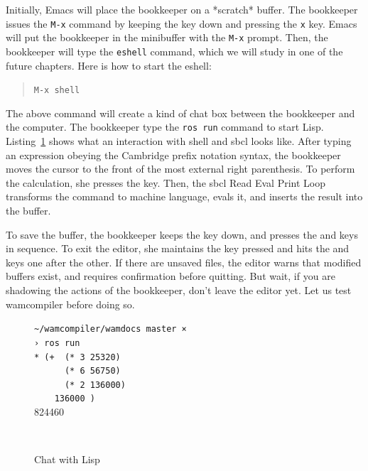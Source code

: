 \documentclass[a4paper,12pt]{book}
\newenvironment{fmpage}[1]
           {\begin{lrbox}{\fmbox}\begin{minipage}{#1}}
           {\end{minipage}\end{lrbox}\fbox{\usebox{\fmbox}}}
\begin{document}
Initially, Emacs will place the bookkeeper
on a *scratch* buffer. The bookkeeper issues
the \verb|M-x| command by keeping the 
key down and pressing the \verb|x| key.
Emacs will put the bookkeeper in the minibuffer
with the \verb|M-x| prompt. Then, the bookkeeper
will type the \verb|eshell| command, which we
will study in one of the future chapters.
Here is how to start the eshell:
\begin{quote}
\verb|M-x shell| 
\end{quote}
The above command will create a kind of chat
box between the bookkeeper and the computer.
The bookkeeper type the \verb|ros run| command
to start Lisp.  Listing~\ref{texan:photos} shows
what an interaction with shell and sbcl looks
like. After typing an expression obeying the
Cambridge prefix notation syntax,
the bookkeeper moves the cursor to the front
of the most external right parenthesis.
To perform the calculation, she presses
the  key. Then, the sbcl Read Eval
Print Loop transforms the command to machine
language, evals it, and inserts the result into
the buffer.

To save the buffer, the bookkeeper
keeps the  key down, and presses
the  and  keys in sequence.
To exit the editor, she maintains the 
key pressed and hits the  and 
keys one after the other. If there are unsaved files,
the editor warns that modified buffers exist,
and requires confirmation before quitting. But wait,
if you are shadowing the actions of the bookkeeper,
don't leave the editor yet. Let us test wamcompiler
before doing so.

\begin{figure}[!h]
\begin{fmpage}{0.8\textwidth}
\verb|~/wamcompiler/wamdocs master ×|\\
\verb|› ros run|\\
\verb|* (+  (* 3 25320)|\\
\verb|      (* 6 56750)|\\
\verb|      (* 2 136000)|\\
\verb|    136000 )|\\ 
824460
\end{fmpage}
\begin{fmpage}{0.8\textwidth}
\verb| |
\end{fmpage}
\caption{Chat with Lisp}
\label{texan:photos}
\end{figure}
\end{document}
